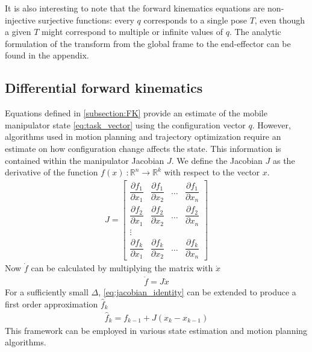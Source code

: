 \documentclass[times, utf8, diplomski, english]{fer}
\begin{document}
It is also interesting to note that the forward kinematics equations are non-injective surjective functions: 
every $q$ corresponds to a single pose $T$, even though a given $T$ might correspond to multiple or infinite values of $q$.
The analytic formulation of the transform from the global frame to the end-effector can be found in the appendix.

\subsection{Differential forward kinematics}
Equations defined in \autoref{subsection:FK} provide an estimate of the mobile manipulator state \eqref{eq:task_vector} using the configuration vector $q$. 
However, algorithms used in motion planning and trajectory optimization require an estimate on how configuration change affects the state.
This information is contained within the manipulator Jacobian $J$.
We define the Jacobian $J$ as the derivative of the function $f\left(x\right) \ : \mathbb{R}^n \rightarrow \mathbb{R}^k $ with respect to the vector $x$.
\begin{align}\label{eq:jacobian}
J =
\begin{bmatrix}
    \dfrac{\partial {f_1}}{\partial x_{1}}      & \dfrac{\partial {f}_{1}}{\partial x_{2}}  & \dots & \dfrac{\partial {f}_{1}}{\partial x_{n}}  \\
    \dfrac{\partial{f_2}}{\partial x_{1}}      & \dfrac{\partial {f}_{2}}{\partial x_{2}}  & \dots & \dfrac{\partial {f}_{2}}{\partial x_{n}} \\
    \vdots \\
    \dfrac{\partial {f_k}}{\partial x_{1}}      & \dfrac{\partial {f}_{k}}{\partial x_{2}}  & \dots & \dfrac{\partial {f}_{k}}{\partial x_{n}}
\end{bmatrix}
\end{align}
Now $\dot{f}$ can be calculated by multiplying the matrix with $\dot{x}$
\begin{align} \label{eq:jacobian_identity}
\dot{f} = J \dot{x}
\end{align}
For a sufficiently small $\Delta$, \eqref{eq:jacobian_identity} can be extended to produce a first order approximation $\hat{f}_k$ 
\begin{align} \label{eq:jacobian_estimate}
\hat{f}_k = f_{k-1} + J\left(x_{k} - x_{k-1}\right)
\end{align}
This framework can be employed in various state estimation and motion planning algorithms.
\newpage
\end{document}
